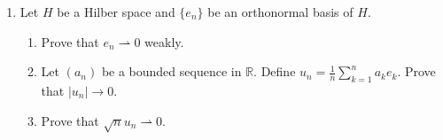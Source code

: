 \documentclass[10pt, oneside]{article}
\newcommand{\bbR}{\mathbb{R}}
\theoremstyle{definition}
\begin{document}
\begin{enumerate}
\item Let $H$ be a Hilber space and $\{e_n\}$ be an orthonormal basis of $H.$
\begin{enumerate}
    \item Prove that $e_n \rightharpoonup  0$ weakly.
    \item Let $(a_n)$ be a bounded sequence in $\bbR.$ Define $u_n = \frac{1}{n}\sum_{k=1}^n a_k e_k.$ Prove that $|u_n|\to 0.$
    \item Prove that $\sqrt{n}u_n \rightharpoonup 0.$
\end{enumerate}
\end{enumerate}
\end{document}

